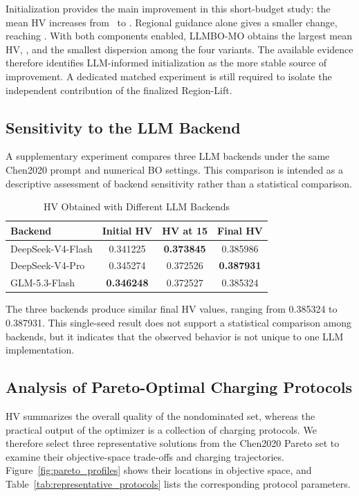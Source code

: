 Initialization provides the main improvement in this short-budget study: the
mean HV increases from \AblationBaselineMean\ to \AblationWarmMean. Regional
guidance alone gives a smaller change, reaching \AblationRegionMean. With both
components enabled, LLMBO-MO obtains the largest mean HV,
\AblationFullMean, and the smallest dispersion among the four variants. The
available evidence therefore identifies LLM-informed initialization as the
more stable source of improvement. A dedicated matched experiment is still
required to isolate the independent contribution of the finalized Region-Lift.

\subsection{Sensitivity to the LLM Backend}
\label{sec:llm_backends}

A supplementary experiment compares three LLM backends under the same
Chen2020 prompt and numerical BO settings. This comparison is intended as a 
descriptive assessment of backend sensitivity rather than a statistical comparison.
\begin{table}[!t]
\caption{HV Obtained with Different LLM Backends}
\label{tab:llm_backends}
\centering
\footnotesize
\setlength{\tabcolsep}{4.5pt}
\begin{tabular}{@{}lccc@{}}
\toprule
Backend & Initial HV & HV at 15 & Final HV \\
\midrule
DeepSeek-V4-Flash & 0.341225 & \textbf{0.373845} & 0.385986 \\
DeepSeek-V4-Pro & 0.345274 & 0.372526 & \textbf{0.387931} \\
GLM-5.3-Flash & \textbf{0.346248} & 0.372527 & 0.385324 \\
\bottomrule
\end{tabular}
\end{table}

The three backends produce similar final HV values, ranging from 0.385324 to
0.387931. This single-seed result does not support a statistical comparison
among backends, but it indicates that the observed behavior is not unique to
one LLM implementation.

\subsection{Analysis of Pareto-Optimal Charging Protocols}

HV summarizes the overall quality of the nondominated set, whereas the
practical output of the optimizer is a collection of charging protocols. We
therefore select three representative solutions from the Chen2020 Pareto set
to examine their objective-space trade-offs and charging trajectories.
Figure~\ref{fig:pareto_profiles} shows their locations in objective space, and
Table~\ref{tab:representative_protocols} lists the corresponding protocol
parameters.

